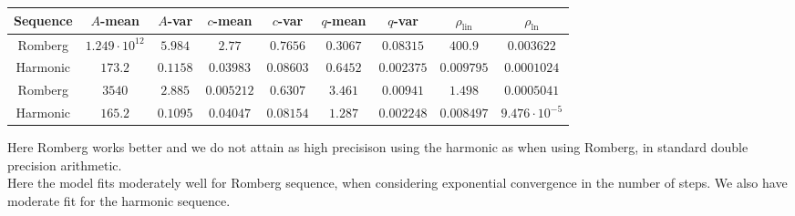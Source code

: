 \begin{table}[H]
    \centering
    \small
    \begin{tabular}{c||c|c|c|c|c|c|c|c}
Sequence & \(A\)-mean & \(A\)-var & \(c\)-mean & \(c\)-var & \(q\)-mean & \(q\)-var & \(\rho_{\operatorname{lin}}\) & \(\rho_{\ln}\)\\\hline
\rowcolor{red}
Romberg & \(1.249\cdot 10^{12}\) & \(5.984\) & \(2.77\) & \(0.7656\) & \(0.3067\) & \(0.08315\) & \(400.9\) & \(0.003622\) \\
\rowcolor{green}
Harmonic & \(173.2\) & \(0.1158\) & \(0.03983\) & \(0.08603\) & \(0.6452\) & \(0.002375\) & \(0.009795\) & \(0.0001024\) \\
\rowcolor{green}
Romberg & \(3540\) & \(2.885\) & \(0.005212\) & \(0.6307\) & \(3.461\) & \(0.00941\) & \(1.498\) & \(0.0005041\) \\
\rowcolor{green}
Harmonic & \(165.2\) & \(0.1095\) & \(0.04047\) & \(0.08154\) & \(1.287\) & \(0.002248\) & \(0.008497\) & \(9.476\cdot 10^{-5}\) \\
    \end{tabular}
    \label{tab:my_label}
\end{table}

Here Romberg works better and we do not attain as high precisison using the harmonic as when using Romberg, in standard double precision arithmetic.\\

Here the model fits moderately well for Romberg sequence, when considering exponential convergence in the number of steps. We also have moderate fit for the harmonic sequence.

